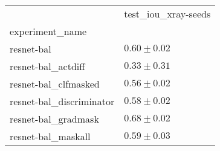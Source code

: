 \begin{tabular}{ll}
\toprule
{} & test_iou_xray-seeds \\
experiment_name          &                     \\
\midrule
resnet-bal               &       $0.60\pm0.02$ \\
resnet-bal_actdiff       &       $0.33\pm0.31$ \\
resnet-bal_clfmasked     &       $0.56\pm0.02$ \\
resnet-bal_discriminator &       $0.58\pm0.02$ \\
resnet-bal_gradmask      &       $0.68\pm0.02$ \\
resnet-bal_maskall       &       $0.59\pm0.03$ \\
\bottomrule
\end{tabular}
